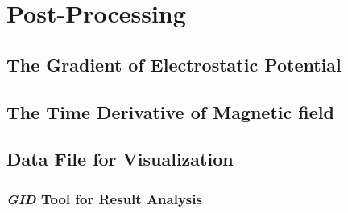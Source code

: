\documentclass[../Dissertation]{subfiles}
\begin{document}
\section{Post-Processing}		\label{sec:PostProcessing}
    \lipsum[1]
    \subsection{The Gradient of Electrostatic Potential}
    \lipsum[1]
    \subsection{The Time Derivative of Magnetic field}
    \lipsum[1]
    \subsection{Data File for Visualization}
    \lipsum[5]
    \subsubsection{\emph{GID} Tool for Result Analysis}
\end{document}
